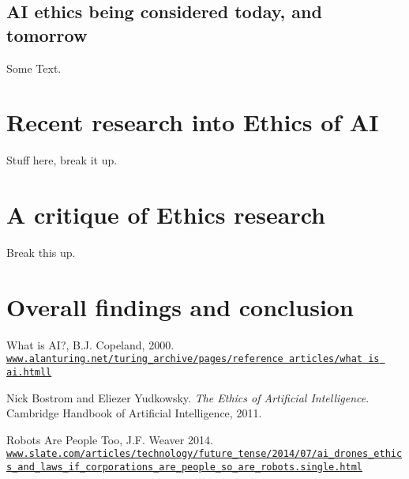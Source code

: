 \documentclass[article]{IEEEtran}
\begin{document}
\subsection{AI ethics being considered today, and tomorrow}
Some Text.

\section{Recent research into Ethics of AI}
Stuff here, break it up.

\section{A critique of Ethics research}
Break this up.

\section{Overall findings and conclusion}

\begin{thebibliography}{9}

What is AI?, B.J. Copeland, 2000.
\\\texttt{\url{www.alanturing.net/turing_archive/pages/reference articles/what is ai.htmll}}

Nick Bostrom and Eliezer Yudkowsky. 
\textit{The Ethics of Artificial Intelligence}. 
Cambridge Handbook of Artificial Intelligence, 2011.

Robots Are People Too, J.F. Weaver 2014.
\\\texttt{\url{www.slate.com/articles/technology/future_tense/2014/07/ai_drones_ethics_and_laws_if_corporations_are_people_so_are_robots.single.html}}

\end{thebibliography}
\end{document}

